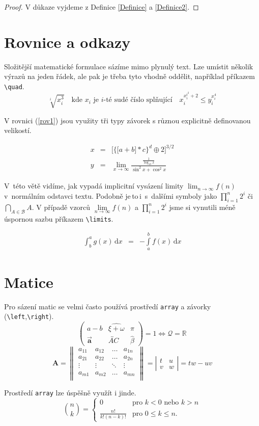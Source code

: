 \documentclass[a4paper, 11pt, twocolumn]{article}
\theoremstyle{definition}
\begin{document}
\begin{proof}
    V důkaze vyjdeme z Definice \ref{Definice} a \ref{Definice2}.
\end{proof}

\section{Rovnice a odkazy}
Složitější matematické formulace sázíme mimo plynulý text. Lze umístit několik výrazů na jeden řádek, ale pak je třeba tyto vhodně oddělit, například příkazem \verb|\quad|.
$$
\sqrt[i]{x_i ^3} \quad
\text{kde } x_i  \text{ je } i \text{-té sudé číslo splňující} \quad
x_i ^{x_i ^{i^2} +2} \leq y_i ^{x_i ^4}
$$

V rovnici (\ref{rov1}) jsou využity tři typy závorek s různou explicitně definovanou velikostí.

 \begin{eqnarray}
 \label{rov1}
    x &=& \bigg[\Big\{\big[a + b\big] * c\Big\}^d \oplus 2 \bigg]^{3/2} \\
    y &=& \lim_{x\to\infty}\frac{\frac{1}{\log_{10}x}}{\sin^2 x + \cos^2 x} \nonumber
 \end{eqnarray}
 
V~této větě vidíme, jak vypadá implicitní vysázení limity $ \lim_{n\to\infty} f(n) $
v~normálním odstavci textu. Podobně je\,to\,i~s~dalšími symboly jako $\prod_{i=1}^n2^i$ či $\bigcap_{A \in\mathcal{B}} A$. V pří\-padě vzorců $\lim\limits_{n\to\infty} f(n) $ a $
\prod\limits_{i=1}^n 2^i$ jsme si vynutili méně úspornou sazbu příkazem \verb|\limits|.

\begin{eqnarray}
   \int^a_b g(x)\,\mathrm{d}x &=& -\int\limits_a ^b f(x)\,\mathrm{d}x
\end{eqnarray}
\section{Matice}
Pro sázení matic se velmi často používá prostředí \verb|array| a závorky (\verb|\left|,\verb|\right|).
$$
\left(
\begin{array}{ccc}
a - b & \widehat{\xi + \omega} & \pi\\
\vec {\mathbf{a}} & \overleftrightarrow{AC} & \hat{\beta}
\end{array}
\right)
=1 \Longleftrightarrow \mathcal{Q} = \mathbb{R}
$$
$$
\mathbf{A} =
\left\|
\begin{array}{cccc}
a_{11} & a_{12} & \ldots & a_{1n} \\
a_{21} & a_{22} & \ldots & a_{2n} \\
\vdots & \vdots & \ddots & \vdots \\
a_{m1} & a_{m2} & \ldots & a_{mn} \\
\end{array}
\right\|
=
\left|
\begin{array}{cc}
 t & u \\ v & w
\end{array}
\right|
= tw - uv
$$

Prostředí \verb|array| lze úspěšně využít i jinde.
$$
\binom{n}{k} =
\left\{
\begin{array}{cl}
0 & \text{pro } k < 0 \text{ nebo } k > n \\
\frac{n!}{k!(n-k)!} & \text{pro } 0 \leq k \leq n\text{.}
\end{array}
\right.
$$
\end{document}
